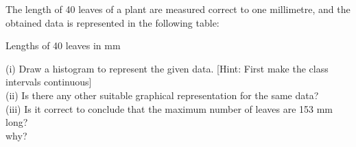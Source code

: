 The length of 40 leaves of a plant are measured correct to one millimetre, and the obtained data is represented in the following table:\\
\begin{table}[ht!]
\centering

\caption{Lengths of 40 leaves in mm}
\label{table:input_stat40}
\end{table}
(i) Draw a histogram to represent the given data. [Hint: First make the class intervals continuous]\\
(ii) Is there any other suitable graphical representation for the same data?\\
(iii) Is it correct to conclude that the maximum number of leaves are 153 mm long?\\
why?\\

